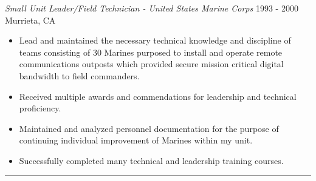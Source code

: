 \documentclass[10pt]{res} %
\begin{document}
\begin{resume}
{\sl Small Unit Leader/Field Technician - United States Marine Corps} \hfill 1993 - 2000 \\
Murrieta, CA 
\begin{itemize} \itemsep -2pt %
\item Lead and maintained the necessary technical knowledge and discipline of teams consisting of 30 Marines purposed to install and operate remote communications outposts which provided secure mission critical digital bandwidth to field commanders.
\item Received multiple awards and commendations for leadership and technical proficiency.
\item Maintained and analyzed personnel documentation for the purpose of continuing individual improvement of Marines within my unit.
\item Successfully completed many technical and leadership training courses.
\end{itemize}

\vspace{0.2in} %

\noindent\rule{\textwidth}{1pt}

\end{resume}
\end{document}
